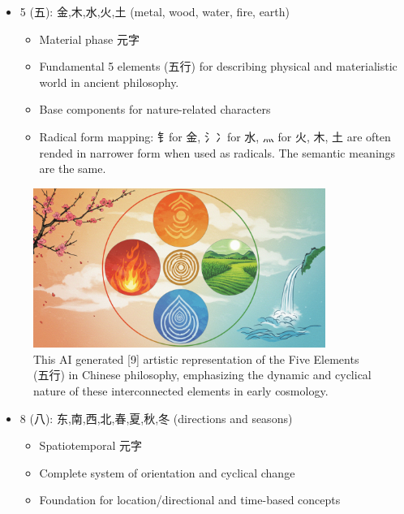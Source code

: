 \documentclass[11pt,letterpaper]{article}
\begin{document}
\begin{itemize}
\tightlist
\item
  5 (五): 金,木,水,火,土 (metal, wood, water, fire, earth)

  \begin{itemize}
  \tightlist
  \item
    Material phase 元字
  \item
    Fundamental 5 elements (五行) for describing physical and
    materialistic world in ancient philosophy.
  \item
    Base components for nature-related characters
  \item
    Radical form mapping: 钅for 金, 氵冫for 水, 灬 for 火, 木, 土 are
    often rended in narrower form when used as radicals. The semantic
    meanings are the same.
  \end{itemize}
\end{itemize}

\begin{figure}
\centering
\includegraphics[width=0.85\textwidth]{./images/five-elements.jpg}
\caption{This AI generated {[}9{]} artistic representation of the Five
Elements (五行) in Chinese philosophy, emphasizing the dynamic and
cyclical nature of these interconnected elements in early cosmology.}
\end{figure}

\begin{itemize}
\tightlist
\item
  8 (八): 东,南,西,北,春,夏,秋,冬 (directions and seasons)

  \begin{itemize}
  \tightlist
  \item
    Spatiotemporal 元字
  \item
    Complete system of orientation and cyclical change
  \item
    Foundation for location/directional and time-based concepts
  \end{itemize}
\end{itemize}
\end{document}

